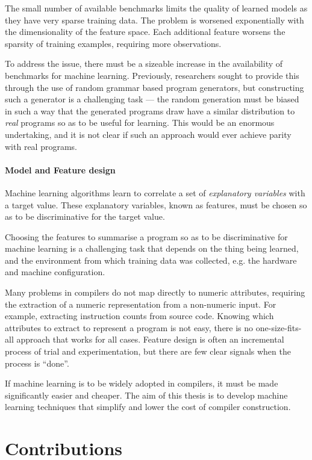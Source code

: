 The small number of available benchmarks limits the quality of learned models as they have very sparse training data. The problem is worsened exponentially with the dimensionality of the feature space. Each additional feature worsens the sparsity of training examples, requiring more observations.

To address the issue, there must be a sizeable increase in the availability of benchmarks for machine learning. Previously, researchers sought to provide this through the use of random grammar based program generators, but constructing such a generator is a challenging task --- the random generation must be biased in such a way that the generated programs draw have a similar distribution to \emph{real} programs so as to be useful for learning. This would be an enormous undertaking, and it is not clear if such an approach would ever achieve parity with real programs.

\paragraph*{Model and Feature design} Machine learning algorithms learn to correlate a set of \emph{explanatory variables} with a target value. These explanatory variables, known as features, must be chosen so as to be discriminative for the target value.

Choosing the features to summarise a program so as to be discriminative for machine learning is a challenging task that depends on the thing being learned, and the environment from which training data was collected, e.g. the hardware and machine configuration.

Many problems in compilers do not map directly to numeric attributes, requiring the extraction of a numeric representation from a non-numeric input. For example, extracting instruction counts from source code. Knowing which attributes to extract to represent a program is not easy, there is no one-size-fits-all approach that works for all cases. Feature design is often an incremental process of trial and experimentation, but there are few clear signals when the process is ``done''.

If machine learning is to be widely adopted in compilers, it must be made significantly easier and cheaper. The aim of this thesis is to develop machine learning techniques that simplify and lower the cost of compiler construction.


\section{Contributions}

